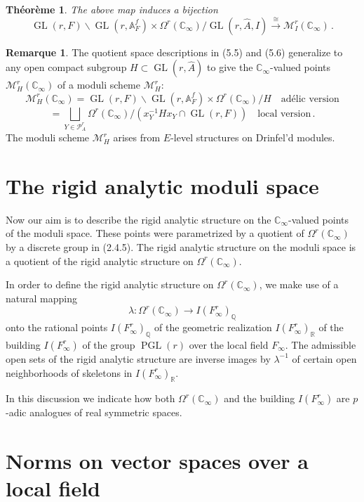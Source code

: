\documentclass[12pt,a4paper]{article}
\theoremstyle{plain}
\newtheorem{theorem}{Th\'eor\`eme}[section]
\theoremstyle{definition}
\newtheorem{remark}{Remarque}[section]
\theoremstyle{remark}
\DeclareMathOperator{\GL}{GL}
\DeclareMathOperator{\PGL}{PGL}
\begin{document}
\begin{theorem}
The above map induces a bijection
\[
\GL(r,F) \backslash \GL(r,\mathbb{A}_F^f) \times \Omega^r(\mathbb{C}_\infty)/\GL(r,\widehat{A},I) \xrightarrow{\;\cong\;} \mathcal{M}_I^r(\mathbb{C}_\infty) \,.
\]
\end{theorem}

\begin{remark}
The quotient space descriptions in (5.5) and (5.6) generalize to any open 
compact subgroup $H \subset \GL(r,\widehat{A})$ to give the $\mathbb{C}_\infty$-valued 
points $\mathcal{M}_H^r(\mathbb{C}_\infty)$ of a moduli scheme $\mathcal{M}_H^r$:
\[
\mathcal{M}_H^r(\mathbb{C}_\infty) = \GL(r,F) \backslash \GL(r,\mathbb{A}_F^f) \times \Omega^r(\mathbb{C}_\infty)/H \quad\text{ad\'elic version}
\]
\[
= \bigsqcup_{Y \in \mathcal{P}_A^r} \Omega^r(\mathbb{C}_\infty)/(x_Y^{-1}Hx_Y \cap \GL(r,F)) \quad\text{local version} \,.
\]
The moduli scheme $\mathcal{M}_H^r$ arises from $E$-level structures on 
Drinfel'd modules.
\end{remark}


\section*{The rigid analytic moduli space}

Now our aim is to describe the rigid analytic structure on the 
$\mathbb{C}_\infty$-valued points of the moduli space. These points were 
parametrized by a quotient of $\Omega^r(\mathbb{C}_\infty)$ by a discrete group 
in (2.4.5). The rigid analytic structure on the moduli space is a quotient 
of the rigid analytic structure on $\Omega^r(\mathbb{C}_\infty)$.

In order to define the rigid analytic structure on $\Omega^r(\mathbb{C}_\infty)$, 
we make use of a natural mapping
\[
\lambda\colon \Omega^r(\mathbb{C}_\infty) \longrightarrow I(F_\infty^r)_\mathbb{Q}
\]
onto the rational points $I(F_\infty^r)_\mathbb{Q}$ of the geometric realization 
$I(F_\infty^r)_\mathbb{R}$ of the building $I(F_\infty^r)$ of the group 
$\PGL(r)$ over the local field $F_\infty$. The admissible open sets of the 
rigid analytic structure are inverse images by $\lambda^{-1}$ of certain open 
neighborhoods of skeletons in $I(F_\infty^r)_\mathbb{R}$.

In this discussion we indicate how both $\Omega^r(\mathbb{C}_\infty)$ and the 
building $I(F_\infty^r)$ are $p$-adic analogues of real symmetric spaces.


\section{Norms on vector spaces over a local field}
\end{document}

